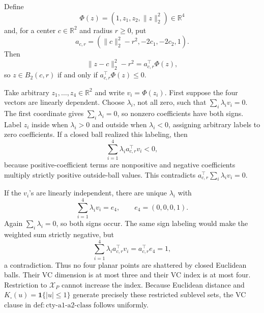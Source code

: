 Define
\[
 \Phi(z)=(1,z_1,z_2,\lVert z\rVert_2^2)\in\mathbb R^4
\]
and, for a center \(c\in\mathbb R^2\) and radius \(r\geq0\), put
\[
 a_{c,r}=(\lVert c\rVert_2^2-r^2,-2c_1,-2c_2,1).
\]
Then
\[
 \lVert z-c\rVert_2^2-r^2=a_{c,r}^{\top}\Phi(z),
\]
so \(z\in B_2(c,r)\) if and only if \(a_{c,r}^{\top}\Phi(z)\leq0\).

Take arbitrary \(z_1,\ldots,z_4\in\mathbb R^2\) and write \(v_i=\Phi(z_i)\).  First suppose the four vectors are linearly dependent.  Choose \(\lambda_i\), not all zero, such that \(\sum_i\lambda_iv_i=0\).  The first coordinate gives \(\sum_i\lambda_i=0\), so nonzero coefficients have both signs.  Label \(z_i\) inside when \(\lambda_i>0\) and outside when \(\lambda_i<0\), assigning arbitrary labels to zero coefficients.  If a closed ball realized this labeling, then
\[
 \sum_{i=1}^4\lambda_i a_{c,r}^{\top}v_i<0,
\]
because positive-coefficient terms are nonpositive and negative coefficients multiply strictly positive outside-ball values.  This contradicts \(a_{c,r}^{\top}\sum_i\lambda_iv_i=0\).

If the \(v_i\)'s are linearly independent, there are unique \(\lambda_i\) with
\[
 \sum_{i=1}^4\lambda_iv_i=e_4,
 \qquad e_4=(0,0,0,1).
\]
Again \(\sum_i\lambda_i=0\), so both signs occur.  The same sign labeling would make the weighted sum strictly negative, but
\[
 \sum_{i=1}^4\lambda_i a_{c,r}^{\top}v_i
 =a_{c,r}^{\top}e_4=1,
\]
a contradiction.  Thus no four planar points are shattered by closed Euclidean balls.  Their VC dimension is at most three and their VC index is at most four.  Restriction to \(\mathcal X_P\) cannot increase the index.  Because Euclidean distance and \(K_\square(u)=\mathbf1\{|u|\leq1\}\) generate precisely these restricted sublevel sets, the VC clause in \(\mathrm{def:cty\text{-}a1\text{-}a2\text{-}class}\) follows uniformly.